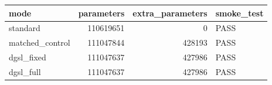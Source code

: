 \begin{tabular}{lrrl}
\toprule
mode & parameters & extra\_parameters & smoke\_test \\
\midrule
standard & 110619651 & 0 & PASS \\
matched\_control & 111047844 & 428193 & PASS \\
dgsl\_fixed & 111047637 & 427986 & PASS \\
dgsl\_full & 111047637 & 427986 & PASS \\
\bottomrule
\end{tabular}
